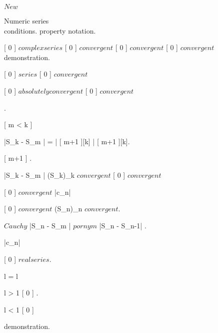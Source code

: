 \documentclass[../Main/main]{subfiles}
\begin{document}
\unit{ $ New $ }
{

	
	
	Numeric series \\

	{
		{
		}
		{
			conditions.
		}
		\denote
		{
			property \as notation.
		}
	}
	
	{
		{
			[ 0 ] $ complex series $
		}
		\holds
		{
			[ 0 ] $ convergent $ \ifandonlyif {}[ 0 ] $ convergent $ \logicAnd {}[ 0 ] $ convergent $	
		}
		\demonstration
		{
			demonstration.
		}
	}
	
	{
		{
			[ 0 ] $ series $
		}
		{
			[ 0 ] $ convergent $
		}
	}
	
	
	{
		{
			[ 0 ] $ absolutely convergent $
		}
		\holds
		{
			[ 0 ] $ convergent $
		}
		\demonstration
		{
			.

			{
				|S_k - S_m | = | [ m+1 ][k] | \leq {}[ m+1 ][k].

				\leq {}[ m+1 ] .

				|S_k - S_m |  \imp (S_k)_k $ convergent $ \imp {}[ 0 ] $ convergent $
			}
		}
	}
	
	
	{
		{
			[ 0 ] $ convergent $
		}
		\holds
		{
			|c_n| 
		}
		\demonstration
		{
			[ 0 ] $ convergent $ \ifandonlyif (S_n)_n $ convergent $.

			\imp $ Cauchy $ |S_n - S_m |  $ por n y m $ \imp |S_n - S_{n-1}| .

			\imp |c_n| 
		}
	}
	
	
	{
		{
			[ 0 ] $ real series $.

			l \in \R \suchthat {} = l
		}
		\holds
		{
			l > 1 \imp {}[ 0 ] \nin \R.

			l < 1 \imp {}[ 0 ] \in \R
		}
		\demonstration
		{
			demonstration.
		}
	}
	
}
\end{document}
